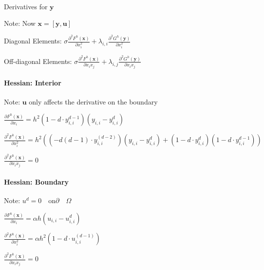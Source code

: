 \documentclass[unicode,11pt,a4paper,oneside,numbers=endperiod,openany]{scrartcl}
\begin{document}
Derivatives for $\mathbf{y}$

Note: Now $\mathbf{x} = [\mathbf{y},\mathbf{u}]$

Diagonal Elements:
$\sigma\frac{\partial^2 F^h(\mathbf{x})}{\partial x_{i}^2}
+ \lambda_{i,i} \frac{\partial^2 G^h(\mathbf{y})}{\partial x_{i}^2}$

Off-diagonal Elements:
$\sigma\frac{\partial^2 F^h(\mathbf{x})}{\partial x_{i}x_{j}}
+ \lambda_{i,j} \frac{\partial^2 G^h(\mathbf{y})}{\partial x_{i}x_{j}}$


\paragraph{Hessian: Interior}
Note: $\mathbf{u}$ only affects the derivative on the boundary

$\frac{\partial F^h(\mathbf{x})}{\partial x_{i}} 
 = h^2 ( 1 - d\cdot y_{i,i}^{d-1} ) (y_{i,i} - y_{i,i}^d)$

$\frac{\partial^2 F^h(\mathbf{x})}{\partial x_{i}^2}
= h^2( (-d(d-1)\cdot y_{i,i}^{(d-2)})(y_{i,i} - y_{i,i}^d) 
  + (1-d\cdot y_{i,i}^d)(1-d\cdot y_{i,i}^{d-1}) )$



$\frac{\partial^2 F^h(\mathbf{x})}{\partial x_{i}x_{j}}=0$

\paragraph{Hessian: Boundary} Note: $u^d=0 \quad \text{on} \partial \quad \Omega$

$\frac{\partial F^h(\mathbf{x})}{\partial x_{i}} 
= \alpha h (u_{i,i} - u_{i,i}^d)$


$\frac{\partial^2 F^h(\mathbf{x})}{\partial x_{i}^2} 
= \alpha h^2 (1 - d\cdot u_{i,i}^{(d-1)})$

$\frac{\partial^2 F^h(\mathbf{x})}{\partial x_{i}x_{j}} = 0$
\end{document}
